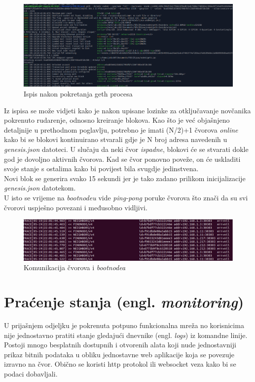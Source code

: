 \documentclass[times, utf8, zavrsni, numeric]{fer}
\begin{document}
\begin{figure}[ht]
  \includegraphics[width=\textwidth]{nodeStart.png}
  \caption{Ispis nakon pokretanja geth procesa}
  \centering
\end{figure}

Iz ispisa se može vidjeti kako je nakon upisane lozinke za otključavanje novčanika pokrenuto rudarenje, odnosno kreiranje blokova.
Kao što je već objašnjeno detaljnije u prethodnom poglavlju, potrebno je imati (N/2)+1 čvorova \emph{online} kako bi se blokovi
kontinuirano stvarali gdje je N broj adresa navedenih u \emph{genesis.json} datoteci. U slučaju da neki čvor \emph{ispadne},
blokovi će se stvarati dokle god je dovoljno aktivnih čvorova. Kad se čvor ponovno poveže, on će uskladiti svoje stanje
s ostalima kako bi povijest bila svugdje jedinstvena. \\
Novi blok se generira svako 15 sekundi jer je tako zadano prilikom inicijalizacije \emph{genesis.json} datotekom. \\
U isto se vrijeme na \emph{bootnodeu} vide \emph{ping-pong} poruke čvorova što znači da su svi čvorovi uspješno povezani i međusobno
vidljivi.

\begin{figure}[ht]
  \includegraphics[width=\textwidth]{bootnode.png}
  \caption{Komunikacija čvorova i \emph{bootnodea}}
  \centering
\end{figure}

\pagebreak
\section{Praćenje stanja (engl. \emph{monitoring})}
U prijašnjem odjeljku je pokrenuta potpuno funkcionalna mreža no korisnicima nije jednostavno pratiti stanje gledajući
dnevnike (engl. \emph{logs}) iz komandne linije. Postoji mnogo besplatnih dostupnih i otvorenih alata koji nude jednostavniji
prikaz bitnih podataka u obliku jednostavne web aplikacije koja se povezuje izravno na čvor. Obično se koristi http protokol
ili websocket veza kako bi se podaci dobavljali.
\end{document}

